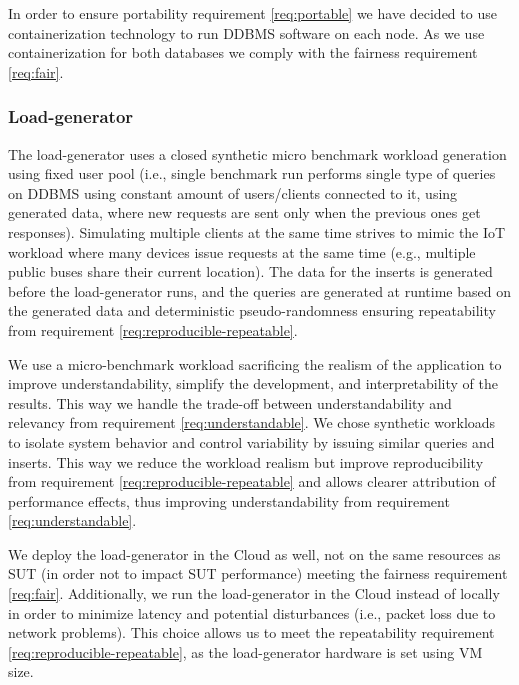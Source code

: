 In order to ensure portability requirement \ref{req:portable} we have decided to use containerization technology to run DDBMS software on each node.
As we use containerization for both databases we comply with the fairness requirement \ref{req:fair}.

\subsubsection{Load-generator}
The load-generator uses a closed synthetic micro benchmark workload generation using fixed user pool
(i.e., single benchmark run performs single type of queries on DDBMS using constant amount of users/clients connected to it, using generated data, where new requests are sent only when the previous ones get responses).
Simulating multiple clients at the same time strives to mimic the IoT workload where many devices issue requests at the same time (e.g., multiple public buses share their current location).
The data for the inserts is generated before the load-generator runs, and the queries are generated at runtime based on the generated data and deterministic pseudo-randomness ensuring repeatability from requirement \ref{req:reproducible-repeatable}.

We use a micro-benchmark workload sacrificing the realism of the application to improve understandability, simplify the development, and interpretability of the results. This way we handle the trade-off between understandability and relevancy from requirement \ref{req:understandable}.
We chose synthetic workloads to isolate system behavior and control variability by issuing similar queries and inserts.
This way we reduce the workload realism but improve reproducibility from requirement \ref{req:reproducible-repeatable} and allows clearer attribution of performance effects, thus improving understandability from requirement \ref{req:understandable}.

We deploy the load-generator in the Cloud as well, not on the same resources as SUT (in order not to impact SUT performance) meeting the fairness requirement \ref{req:fair}.
Additionally, we run the load-generator in the Cloud instead of locally in order to minimize latency and potential disturbances (i.e., packet loss due to network problems).
This choice allows us to meet the repeatability requirement \ref{req:reproducible-repeatable}, as the load-generator hardware is set using VM size.

